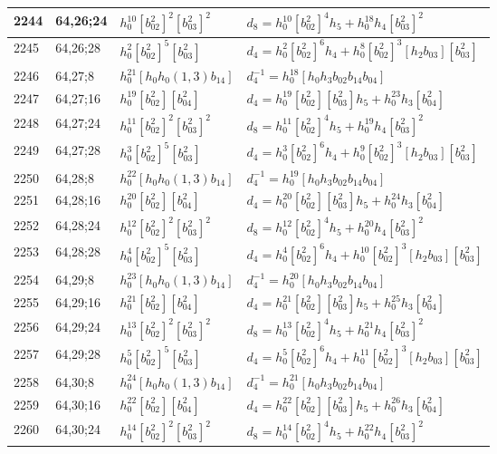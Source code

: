 \documentclass{article}
\begin{document}
\begin{longtable}{|l|l|>{\raggedright\arraybackslash}p{6cm}|>{\raggedright\arraybackslash}p{6cm}|}
2244 & 64,26;24 & $h_0^{10}[b_{02}^2]^2[b_{03}^2]^2$ &$d_{8}=h_0^{10}[b_{02}^2]^4h_5 + h_0^{18}h_4[b_{03}^2]^2$\\
\hline
2245 & 64,26;28 & $h_0^2[b_{02}^2]^5[b_{03}^2]$ &$d_{4}=h_0^2[b_{02}^2]^6h_4 + h_0^8[b_{02}^2]^3[h_2b_{03}][b_{03}^2]$\\
\hline
2246 & 64,27;8 & $h_0^{21}[h_0h_0(1, 3)b_{14}]$ & $d_{4}^{-1}=h_0^{18}[h_0h_3b_{02}b_{14}b_{04}]$\\
\hline
2247 & 64,27;16 & $h_0^{19}[b_{02}^2][b_{04}^2]$ &$d_{4}=h_0^{19}[b_{02}^2][b_{03}^2]h_5 + h_0^{23}h_3[b_{04}^2]$\\
\hline
2248 & 64,27;24 & $h_0^{11}[b_{02}^2]^2[b_{03}^2]^2$ &$d_{8}=h_0^{11}[b_{02}^2]^4h_5 + h_0^{19}h_4[b_{03}^2]^2$\\
\hline
2249 & 64,27;28 & $h_0^3[b_{02}^2]^5[b_{03}^2]$ &$d_{4}=h_0^3[b_{02}^2]^6h_4 + h_0^9[b_{02}^2]^3[h_2b_{03}][b_{03}^2]$\\
\hline
2250 & 64,28;8 & $h_0^{22}[h_0h_0(1, 3)b_{14}]$ & $d_{4}^{-1}=h_0^{19}[h_0h_3b_{02}b_{14}b_{04}]$\\
\hline
2251 & 64,28;16 & $h_0^{20}[b_{02}^2][b_{04}^2]$ &$d_{4}=h_0^{20}[b_{02}^2][b_{03}^2]h_5 + h_0^{24}h_3[b_{04}^2]$\\
\hline
2252 & 64,28;24 & $h_0^{12}[b_{02}^2]^2[b_{03}^2]^2$ &$d_{8}=h_0^{12}[b_{02}^2]^4h_5 + h_0^{20}h_4[b_{03}^2]^2$\\
\hline
2253 & 64,28;28 & $h_0^4[b_{02}^2]^5[b_{03}^2]$ &$d_{4}=h_0^4[b_{02}^2]^6h_4 + h_0^{10}[b_{02}^2]^3[h_2b_{03}][b_{03}^2]$\\
\hline
2254 & 64,29;8 & $h_0^{23}[h_0h_0(1, 3)b_{14}]$ & $d_{4}^{-1}=h_0^{20}[h_0h_3b_{02}b_{14}b_{04}]$\\
\hline
2255 & 64,29;16 & $h_0^{21}[b_{02}^2][b_{04}^2]$ &$d_{4}=h_0^{21}[b_{02}^2][b_{03}^2]h_5 + h_0^{25}h_3[b_{04}^2]$\\
\hline
2256 & 64,29;24 & $h_0^{13}[b_{02}^2]^2[b_{03}^2]^2$ &$d_{8}=h_0^{13}[b_{02}^2]^4h_5 + h_0^{21}h_4[b_{03}^2]^2$\\
\hline
2257 & 64,29;28 & $h_0^5[b_{02}^2]^5[b_{03}^2]$ &$d_{4}=h_0^5[b_{02}^2]^6h_4 + h_0^{11}[b_{02}^2]^3[h_2b_{03}][b_{03}^2]$\\
\hline
2258 & 64,30;8 & $h_0^{24}[h_0h_0(1, 3)b_{14}]$ & $d_{4}^{-1}=h_0^{21}[h_0h_3b_{02}b_{14}b_{04}]$\\
\hline
2259 & 64,30;16 & $h_0^{22}[b_{02}^2][b_{04}^2]$ &$d_{4}=h_0^{22}[b_{02}^2][b_{03}^2]h_5 + h_0^{26}h_3[b_{04}^2]$\\
\hline
2260 & 64,30;24 & $h_0^{14}[b_{02}^2]^2[b_{03}^2]^2$ &$d_{8}=h_0^{14}[b_{02}^2]^4h_5 + h_0^{22}h_4[b_{03}^2]^2$\\

\end{longtable}
\end{document}
